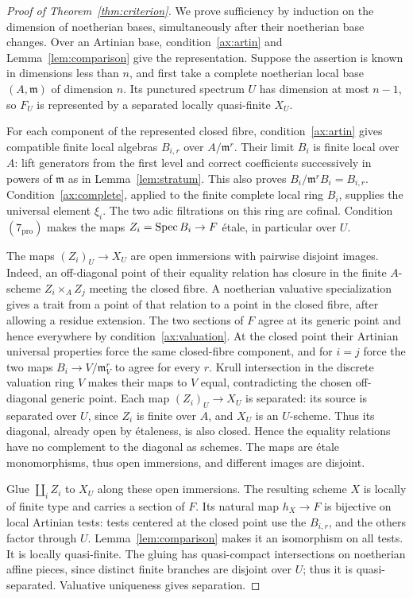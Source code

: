 \begin{proof}[Proof of Theorem~\ref{thm:criterion}]
We prove sufficiency by induction on the dimension of noetherian bases, simultaneously after their noetherian base changes. Over an Artinian base, condition~\ref{ax:artin} and Lemma~\ref{lem:comparison} give the representation. Suppose the assertion is known in dimensions less than $n$, and first take a complete noetherian local base $(A,\mathfrak m)$ of dimension $n$. Its punctured spectrum $U$ has dimension at most $n-1$, so $F_U$ is represented by a separated locally quasi-finite $X_U$.

For each component of the represented closed fibre, condition~\ref{ax:artin} gives compatible finite local algebras $B_{i,r}$ over $A/\mathfrak m^r$. Their limit $B_i$ is finite local over $A$: lift generators from the first level and correct coefficients successively in powers of $\mathfrak m$ as in Lemma~\ref{lem:stratum}. This also proves $B_i/\mathfrak m^rB_i=B_{i,r}$. Condition~\ref{ax:complete}, applied to the finite complete local ring $B_i$, supplies the universal element $\xi_i$. The two adic filtrations on this ring are cofinal. Condition $(7_{\mathrm{pro}})$ makes the maps $Z_i=\operatorname{Spec} B_i\to F$ \'etale, in particular over $U$.

The maps $(Z_i)_U\to X_U$ are open immersions with pairwise disjoint images. Indeed, an off-diagonal point of their equality relation has closure in the finite $A$-scheme $Z_i\times_AZ_j$ meeting the closed fibre. A noetherian valuative specialization gives a trait from a point of that relation to a point in the closed fibre, after allowing a residue extension. The two sections of $F$ agree at its generic point and hence everywhere by condition~\ref{ax:valuation}. At the closed point their Artinian universal properties force the same closed-fibre component, and for $i=j$ force the two maps $B_i\to V/\mathfrak m_V^r$ to agree for every $r$. Krull intersection in the discrete valuation ring $V$ makes their maps to $V$ equal, contradicting the chosen off-diagonal generic point. Each map $(Z_i)_U\to X_U$ is separated: its source is separated over $U$, since $Z_i$ is finite over $A$, and $X_U$ is an $U$-scheme. Thus its diagonal, already open by \'etaleness, is also closed. Hence the equality relations have no complement to the diagonal as schemes. The maps are \'etale monomorphisms, thus open immersions, and different images are disjoint.

Glue $\coprod_iZ_i$ to $X_U$ along these open immersions. The resulting scheme $X$ is locally of finite type and carries a section of $F$. Its natural map $h_X\to F$ is bijective on local Artinian tests: tests centered at the closed point use the $B_{i,r}$, and the others factor through $U$. Lemma~\ref{lem:comparison} makes it an isomorphism on all tests. It is locally quasi-finite. The gluing has quasi-compact intersections on noetherian affine pieces, since distinct finite branches are disjoint over $U$; thus it is quasi-separated. Valuative uniqueness gives separation.


\end{proof}
